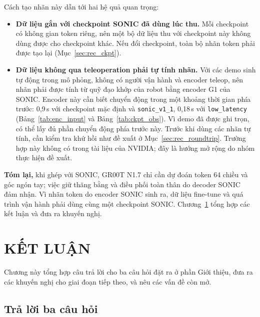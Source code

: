 \documentclass[12pt,a4paper,oneside]{report}
\newcommand{\code}[1]{\texttt{#1}}
\begin{document}
Cách tạo nhãn này dẫn tới hai hệ quả quan trọng:
\begin{itemize}
\item \textbf{Dữ liệu gắn với checkpoint SONIC đã dùng lúc thu.} Mỗi checkpoint có không gian token riêng, nên một bộ dữ liệu thu với checkpoint này không dùng được cho checkpoint khác. Nếu đổi checkpoint, toàn bộ nhãn token phải được tạo lại (Mục~\ref{sec:rec_ckpt}).
\item \textbf{Dữ liệu không qua teleoperation phải tự tính nhãn.} Với các demo sinh tự động trong mô phỏng, không có người vận hành và encoder teleop, nên nhãn phải được tính từ quỹ đạo khớp của robot bằng encoder G1 của SONIC. Encoder này cần biết chuyển động trong một khoảng thời gian phía trước: 0,9\,s với checkpoint mặc định và \code{sonic\_v1\_1}, 0,18\,s với \code{low\_latency} (Bảng~\ref{tab:enc_input} và Bảng~\ref{tab:ckpt_obs}). Vì demo đã được ghi trọn, có thể lấy đủ phần chuyển động phía trước này. Trước khi dùng các nhãn tự tính, cần kiểm tra khứ hồi như đề xuất ở Mục~\ref{sec:rec_roundtrip}. Trường hợp này không có trong tài liệu của NVIDIA; đây là hướng mở rộng do nhóm thực hiện đề xuất.
\end{itemize}

\textbf{Tóm lại,} khi ghép với SONIC, GR00T N1.7 chỉ cần dự đoán token 64 chiều và góc ngón tay; việc giữ thăng bằng và điều phối toàn thân do decoder SONIC đảm nhận. Vì nhãn token do encoder SONIC sinh ra, dữ liệu fine-tune và quá trình vận hành phải dùng cùng một checkpoint SONIC. Chương~\ref{chap:conclusion} tổng hợp các kết luận và đưa ra khuyến nghị.

\chapter{KẾT LUẬN}
\label{chap:conclusion}
Chương này tổng hợp câu trả lời cho ba câu hỏi đặt ra ở phần Giới thiệu, đưa ra các khuyến nghị cho giai đoạn tiếp theo, và nêu các vấn đề còn mở.

\section{Trả lời ba câu hỏi}
\end{document}

